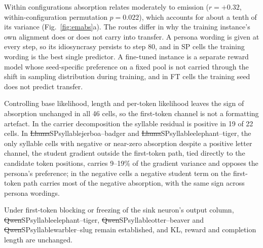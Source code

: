 Within configurations absorption relates moderately to emission ($r = +0.32$, within-configuration permutation $p = 0.022$), which accounts for about a tenth of its variance (Fig.~\ref{fig:emabs}a). The routes differ in why the training instance's own alignment does or does not carry into transfer. A persona wording is given at every step, so its idiosyncrasy persists to step 80, and in SP cells the training wording is the best single predictor. A fine-tuned instance is a separate reward model whose seed-specific preference on a fixed pool is not carried through the shift in sampling distribution during training, and in FT cells the training seed does not predict transfer.

Controlling base likelihood, length and per-token likelihood leaves the sign of absorption unchanged in all 46 cells, so the first-token channel is not a formatting artefact. In the carrier decomposition the syllable residual is positive in 19 of 22 cells. In \st{Llama}{SP}{syllable}{jerboa--badger} and \st{Llama}{SP}{syllable}{elephant--tiger}, the only syllable cells with negative or near-zero absorption despite a positive letter channel, the student gradient outside the first-token path, tied directly to the candidate token positions, carries 9--19\% of the gradient variance and opposes the persona's preference; in the negative  cells a negative student term on the first-token path carries most of the negative absorption, with the same sign across persona wordings.

Under first-token blocking or freezing of the sink neuron's output column, \st{Qwen}{SP}{syllable}{elephant--tiger}, \st{Qwen}{SP}{syllable}{otter--beaver} and \st{Qwen}{SP}{syllable}{warbler--slug} remain established, and KL, reward and completion length are unchanged.


